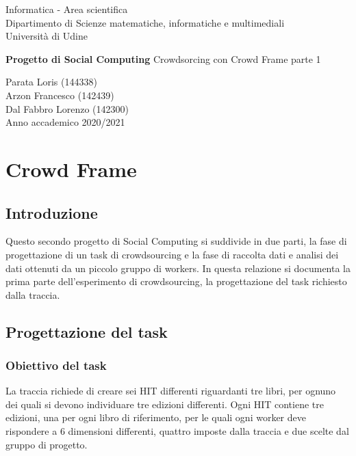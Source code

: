 \documentclass[a4paper,11pt]{report}
\begin{document}
\begin{titlepage}
  \clearpage\thispagestyle{empty}
  \centering
  \vspace{1cm}
  {\normalsize Informatica - Area scientifica \\  Dipartimento di Scienze matematiche, informatiche e multimediali\\  Università di Udine \par}
  \vspace{3cm}
  {\Huge \textbf{Progetto di Social Computing \newline
  } \LARGE{Crowdsorcing con Crowd Frame  parte 1}
  }

  \vspace{4cm}
  {\Large  Parata Loris (144338) \\ Arzon Francesco (142439)\\ Dal Fabbro Lorenzo (142300)\\ }
  \vspace{12cm}
  {\normalsize Anno accademico 2020/2021}
  \pagebreak
\end{titlepage}

\tableofcontents{}
\pagebreak
\chapter{Crowd Frame}
\section{Introduzione}
Questo secondo progetto di Social Computing si suddivide in due parti, la fase di progettazione di un task di crowdsourcing e la fase di raccolta dati e analisi dei dati ottenuti da un piccolo gruppo di workers.
In questa relazione si documenta  la prima parte dell'esperimento di crowdsourcing, la progettazione del task richiesto dalla traccia.


\section{Progettazione del task}

\subsection{Obiettivo del task}
La traccia richiede di creare sei HIT differenti riguardanti tre libri, per ognuno dei quali si devono individuare tre edizioni differenti. Ogni HIT contiene tre edizioni, una per ogni libro di riferimento, per le quali ogni worker deve rispondere a 6 dimensioni differenti, quattro imposte dalla traccia e due scelte dal gruppo di progetto.
\end{document}
